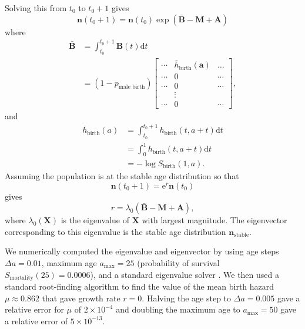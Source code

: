 \documentclass[12pt]{article}
\renewcommand{\vec}[1]{\mathbf{#1}}
\newcommand{\mat}[1]{\mathbf{#1}}
\newcommand{\md}{\mathrm{d}}
\newcommand{\me}{\mathrm{e}}
\begin{document}
Solving this from $t_0$ to $t_0 + 1$ gives
\begin{equation}
  \vec{n}(t_0 + 1) = \vec{n}(t_0)
  \exp\left(\bar{\mat{B}} - \mat{M} + \mat{A}\right)
\end{equation}
where
\begin{equation}
  \begin{split}
    \bar{\mat{B}} &=
    \int_{t_0}^{t_0 + 1} \mat{B}(t) \md t\\
    &=
    (1 - p_{\text{male birth}})
    \begin{bmatrix}
      \cdots & \bar{h}_{\text{birth}}(\vec{a}) & \dots
      \\
      \cdots & 0 & \cdots
      \\
      \cdots & 0 & \cdots
      \\
      & \vdots &
      \\
      \cdots & 0 & \cdots
    \end{bmatrix},
  \end{split}
\end{equation}
and
\begin{equation}
  \begin{split}
    \bar{h}_{\text{birth}}(a)
    &= \int_{t_0}^{t_0 + 1} h_{\text{birth}}(t, a + t) \md t \\
    &= \int_0^1 h_{\text{birth}}(t, a + t) \md t \\
    &= - \log S_{\text{birth}}(1, a).
  \end{split}
\end{equation}
Assuming the population is at the stable age distribution so that
\begin{equation}
  \vec{n}(t_0 + 1) = \me^r \vec{n}(t_0)
\end{equation}
gives
\begin{equation}
  r = \lambda_0\left(\bar{\mat{B}} - \mat{M} + \mat{A}\right),
\end{equation}
where $\lambda_0(\mat{X})$ is the eigenvalue of $\mat{X}$ with largest
magnitude.  The eigenvector corresponding to this eigenvalue is the
stable age distribution $\vec{n}_{\text{stable}}$.

We numerically computed the eigenvalue and eigenvector by using age
steps $\Delta a = 0.01$, maximum age $a_{\text{max}} = 25$
(probability of survival $S_{\text{mortality}}(25) = 0.0006$), and a
standard eigenvalue solver
\citep[\texttt{scipy.sparse.linalg.eigs},][]{scipy}.  We then used a
standard root-finding algorithm
\citep[\texttt{scipy.optimize.fsolve},][]{scipy} to find the value of
the mean birth hazard $\mu \approx 0.862$ that gave growth rate
$r = 0$.  Halving the age step to $\Delta a = 0.005$ gave a relative
error for $\mu$ of $2 \times 10^{-4}$ and doubling the maximum age to
$a_{\text{max}} = 50$ gave a relative error of $5 \times 10^{-13}$.




\end{document}
